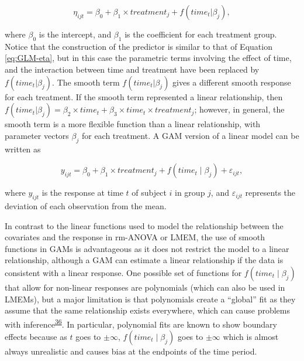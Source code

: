 \documentclass[
]{article}
\begin{document}
\begin{equation}
\eta_{ijt}=\beta_{0}+ \beta_{1} \times treatment_{j} +f(time_{t}|\beta_{j}),
\label{eq:GAM-eta}
\end{equation}

where \(\beta_{0}\) is the intercept, and \(\beta_{1}\) is the coefficient for each treatment group. Notice that the construction of the predictor is similar to that of Equation \eqref{eq:GLM-eta}, but in this case the parametric terms involving the effect of time, and the interaction between time and treatment have been replaced by \(f(time_{t}|\beta_{j})\). The smooth term \(f(time_{t}|\beta_{j})\) gives a different smooth response for each treatment. If the smooth term represented a linear relationship, then \(f(time_{t}|\beta_{j})= \beta_2 \times time_t+\beta_3 \times time_t \times treatment_j\); however, in general, the smooth term is a more flexible function than a linear relationship, with parameter vectors \(\beta_{j}\) for each treatment. A GAM version of a linear model can be written as

\begin{equation}
  y_{ijt}=\beta_0+ \beta_1 \times treatment_j + f(time_t\mid \beta_j)+\varepsilon_{ijt},
  \label{eq:GAM}
\end{equation}

where \(y_{ijt}\) is the response at time \(t\) of subject \(i\) in group \(j\), and \(\varepsilon_{ijt}\) represents the deviation of each observation from the mean.

In contrast to the linear functions used to model the relationship between the covariates and the response in rm-ANOVA or LMEM, the use of smooth functions in GAMs is advantageous as it does not restrict the model to a linear relationship, although a GAM can estimate a linear relationship if the data is consistent with a linear response. One possible set of functions for \(f(time_t\mid \beta_j)\) that allow for non-linear responses are polynomials (which can also be used in LMEMs), but a major limitation is that polynomials create a ``global'' fit as they assume that the same relationship exists everywhere, which can cause problems with inference\textsuperscript{\protect\hyperlink{ref-beck1998}{36}}. In particular, polynomial fits are known to show boundary effects because as \(t\) goes to \(\pm \infty\), \(f(time_t \mid \beta_j)\) goes to \(\pm \infty\) which is almost always unrealistic and causes bias at the endpoints of the time period.
\end{document}
